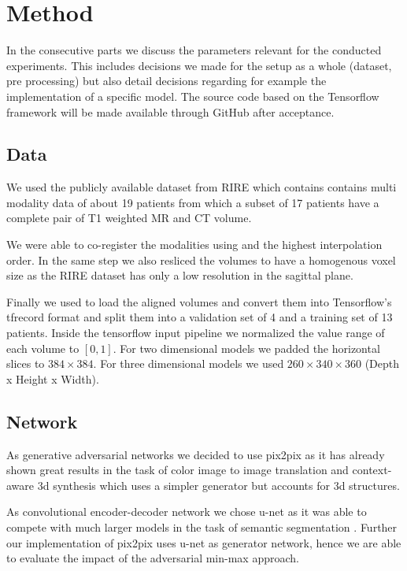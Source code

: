 \section{Method}

In the consecutive parts we discuss the parameters relevant for the conducted
experiments. This includes decisions we made for the setup as a whole
(dataset, pre processing) but also detail decisions regarding for example
the implementation of a specific model. The source code based on the
Tensorflow framework \cite{tensorflow15} will be made available through
GitHub after acceptance.

\subsection{Data}

We used the publicly available dataset from RIRE \cite{RIRE} which contains
contains multi modality data of about 19 patients from which a subset
of 17 patients have a complete pair of T1 weighted MR and CT volume.

We were able to co-register the modalities using \cite{SPM12} and the
highest interpolation order. In the same step we also resliced the volumes
to have a homogenous voxel size as the RIRE dataset has only a low resolution
in the sagittal plane.

Finally we used \cite{Nibabel} to load the aligned volumes and convert them
into Tensorflow's tfrecord format and split them into a validation set of
4 and a training set of 13 patients. Inside the tensorflow input pipeline
we normalized the value range of each volume to $[0,1]$. For two dimensional
models we padded the horizontal slices to $384\times384$. For three
dimensional models we used $260\times340\times360$ (Depth x Height x Width).

\subsection{Network}

As generative adversarial networks we decided to use pix2pix \cite{Isola16}
as it has already shown great results in the task of color image to image
translation and context-aware 3d synthesis \cite{Nie16} which uses a simpler
generator but accounts for 3d structures.

As convolutional encoder-decoder network we chose u-net \cite{Ronneberger15}
as it was able to compete with much larger models in the task of semantic
segmentation \cite{Badrinarayanan15}. Further our implementation of pix2pix
uses u-net as generator network, hence we are able to evaluate the impact
of the adversarial min-max approach.

